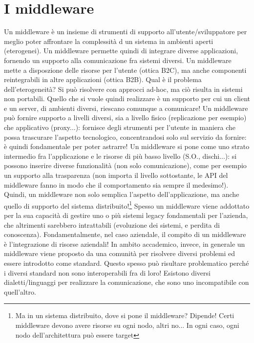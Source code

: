 \section{I middleware}
Un middleware è un insieme di strumenti di supporto all'utente/sviluppatore per meglio poter affrontare la complessità
d un sistema in ambienti aperti (eterogenei). Un middleware permette quindi di integrare diverse applicazioni,
fornendo un supporto alla comunicazione fra sistemi diversi.
Un middleware mette a disposzione delle risorse per l'utente (ottica B2C), ma anche componenti reintegrabili in altre
applicazioni (ottica B2B).
Qual è il problema dell'eterogeneità? Si può risolvere con approcci ad-hoc, ma ciò risulta in sistemi non portabili.
Quello che si vuole quindi realizzare è un supporto per cui un client e un server, di ambienti diversi, riescano
comunque a comunicare!
Un middleware può fornire supporto a livelli diversi, sia a livello fisico (replicazione per esempio) che applicativo
(proxy...): fornisce degli strumenti per l'utente in maniera che possa trascurare l'aspetto tecnologico,
concentrandosi solo sul servizio da fornire: è quindi fondamentale per poter astrarre!
Un middleware si pone come uno strato intermedio fra l'applicazione e le risorse di più basso livello
(S.O., dischi...): si possono inserire diverse funzionalità (non solo comunicazione), come per esempio un supporto
alla trasparenza (non importa il livello sottostante, le API del middleware fanno in modo che il comportamento sia
sempre il medesimo!). Quindi, un middleware non solo semplica l'aspetto dell'applicazione, ma anche quello di supporto
del sistema distribuito!\footnote{Ma in un sistema distribuito, dove si pone il middleware? Dipende! Certi middleware
devono avere risorse su ogni nodo, altri no... In ogni caso, ogni nodo dell'architettura può essere target}
Spesso un middleware viene addottato per la sua capacità di gestire uno o più sistemi legacy fondamentali per
l'azienda, che altrimenti sarebbero intrattabili (evoluzione dei sistemi, e perdita di conoscenza). Fondamentalmente,
nel caso aziendale, il compito di un middleware è l'integrazione di risorse aziendali!
In ambito accademico, invece, in generale un middleware viene proposto da una comunità per risolvere diversi problemi
ed essere introdotto come standard.
Questo spesso può risultare problematico perché i diversi standard non sono interoperabili fra di loro! Esistono
diversi dialetti/linguaggi per realizzare la comunicazione, che sono uno incompatibile con quell'altro.
